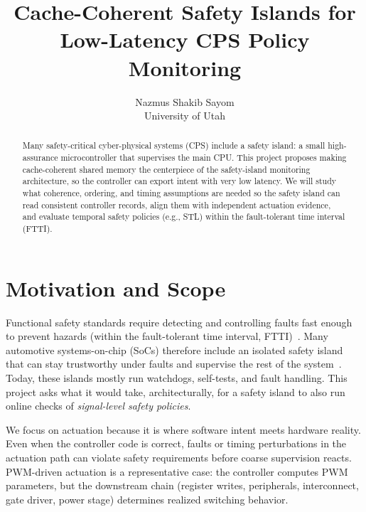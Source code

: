 \documentclass[letterpaper,twocolumn,10pt]{article}
\newcommand{\SafetyIsland}{safety island\xspace}
\newcommand{\STL}{STL\xspace}
\newcommand{\FTTI}{FTTI\xspace}
\newcommand{\PrimaryCompute}{main CPU\xspace}
\begin{document}
\date{}

\title{\Large \bf Cache-Coherent Safety Islands for Low-Latency CPS Policy Monitoring}

\author{
{\rm Nazmus Shakib Sayom}\\
University of Utah
}

\maketitle
\thispagestyle{empty}

\begin{abstract}
Many safety-critical cyber-physical systems (CPS) include a \SafetyIsland: a small high-assurance microcontroller that supervises the \PrimaryCompute. This project proposes making cache-coherent shared memory the centerpiece of the safety-island monitoring architecture, so the controller can export intent with very low latency. We will study what coherence, ordering, and timing assumptions are needed so the \SafetyIsland can read consistent controller records, align them with independent actuation evidence, and evaluate temporal safety policies (e.g., \STL) within the fault-tolerant time interval (\FTTI).
\end{abstract}

\section{Motivation and Scope}
Functional safety standards require detecting and controlling faults fast enough to prevent hazards (within the fault-tolerant time interval, \FTTI)~\cite{ISO26262}. Many automotive systems-on-chip (SoCs) therefore include an isolated \SafetyIsland that can stay trustworthy under faults and supervise the rest of the system~\cite{ArmAutoSolutionsOverview,NVIDIADriveFSI,SiemensSI}. Today, these islands mostly run watchdogs, self-tests, and fault handling. This project asks what it would take, architecturally, for a \SafetyIsland to also run online checks of \emph{signal-level safety policies}.

We focus on actuation because it is where software intent meets hardware reality. Even when the controller code is correct, faults or timing perturbations in the actuation path can violate safety requirements before coarse supervision reacts. PWM-driven actuation is a representative case: the controller computes PWM parameters, but the downstream chain (register writes, peripherals, interconnect, gate driver, power stage) determines realized switching behavior.
\end{document}
